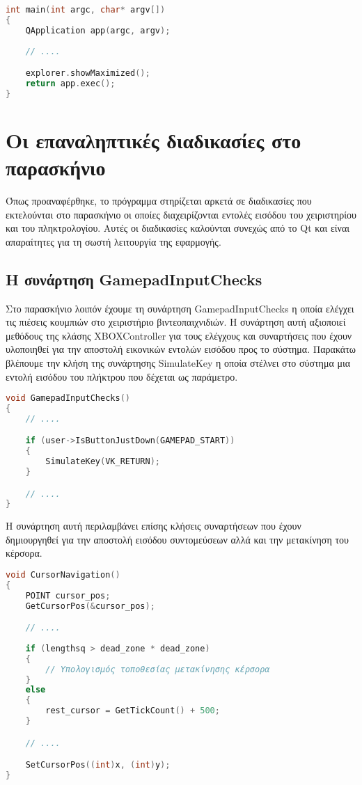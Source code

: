 \begin{lstlisting}[language=C++, style=cppstyle]
int main(int argc, char* argv[]) 
{
    QApplication app(argc, argv);
    
    // ....

    explorer.showMaximized();
    return app.exec();
}
\end{lstlisting}


\section{Οι επαναληπτικές διαδικασίες στο παρασκήνιο}

Όπως προαναφέρθηκε, το πρόγραμμα στηρίζεται αρκετά σε διαδικασίες που εκτελούνται στο παρασκήνιο
οι οποίες διαχειρίζονται εντολές εισόδου του χειριστηρίου και του πληκτρολογίου. Αυτές οι διαδικασίες
καλούνται συνεχώς από το Qt και είναι απαραίτητες για τη σωστή λειτουργία της εφαρμογής. 

\subsection{Η συνάρτηση GamepadInputChecks}
Στο παρασκήνιο λοιπόν έχουμε τη συνάρτηση GamepadInputChecks η οποία ελέγχει τις πιέσεις κουμπιών στο χειριστήριο 
βιντεοπαιχνιδιών. Η συνάρτηση αυτή αξιοποιεί μεθόδους της κλάσης XBOXController για τους ελέγχους και
συναρτήσεις που έχουν υλοποιηθεί για την αποστολή εικονικών εντολών εισόδου προς το σύστημα. Παρακάτω
βλέπουμε την κλήση της συνάρτησης SimulateKey η οποία στέλνει στο σύστημα μια εντολή εισόδου του πλήκτρου
που δέχεται ως παράμετρο.

\begin{lstlisting}[language=C++, style=cppstyle]
void GamepadInputChecks()
{
    // ....

    if (user->IsButtonJustDown(GAMEPAD_START))
    {
        SimulateKey(VK_RETURN);
    }

    // ....
}
\end{lstlisting}

Η συνάρτηση αυτή περιλαμβάνει επίσης κλήσεις συναρτήσεων που έχουν δημιουργηθεί για την αποστολή εισόδου
συντομεύσεων αλλά και την μετακίνηση του κέρσορα.


\begin{lstlisting}[language=C++, style=cppstyle]
void CursorNavigation()
{
    POINT cursor_pos;
    GetCursorPos(&cursor_pos);

    // ....
    
    if (lengthsq > dead_zone * dead_zone)
    {
        // Υπολογισμός τοποθεσίας μετακίνησης κέρσορα
    }
    else
    {
        rest_cursor = GetTickCount() + 500;
    }

    // ....

    SetCursorPos((int)x, (int)y);
}
\end{lstlisting}

